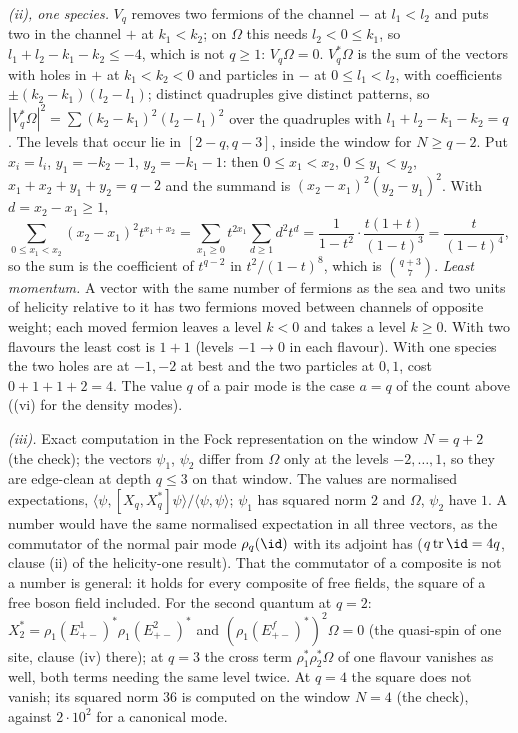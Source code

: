 \emph{(ii), one species.} $V_{q}$ removes two fermions of the channel $-$ at $l_{1} < l_{2}$ and puts two in the channel $+$ at $k_{1} < k_{2}$; on $\Omega$ this needs $l_{2} < 0 \le k_{1}$, so $l_{1} + l_{2} - k_{1} - k_{2} \le -4$, which is not $q \ge 1$: $V_{q}\Omega = 0$. $V_{q}^{*}\Omega$ is the sum of the vectors with holes in $+$ at $k_{1} < k_{2} < 0$ and particles in $-$ at $0 \le l_{1} < l_{2}$, with coefficients $\pm(k_{2} - k_{1})(l_{2} - l_{1})$; distinct quadruples give distinct patterns, so $|V_{q}^{*}\Omega|^{2} = \sum(k_{2} - k_{1})^{2}(l_{2} - l_{1})^{2}$ over the quadruples with $l_{1} + l_{2} - k_{1} - k_{2} = q$. The levels that occur lie in $[2 - q, q - 3]$, inside the window for $N \ge q - 2$. Put $x_{i} = l_{i}$, $y_{1} = -k_{2} - 1$, $y_{2} = -k_{1} - 1$: then $0 \le x_{1} < x_{2}$, $0 \le y_{1} < y_{2}$, $x_{1} + x_{2} + y_{1} + y_{2} = q - 2$ and the summand is $(x_{2} - x_{1})^{2}(y_{2} - y_{1})^{2}$. With $d = x_{2} - x_{1} \ge 1$,
\[
\sum_{0 \le x_{1} < x_{2}}(x_{2} - x_{1})^{2}t^{x_{1} + x_{2}} = \sum_{x_{1} \ge 0}t^{2x_{1}}\sum_{d \ge 1}d^{2}t^{d} = \frac{1}{1 - t^{2}}\cdot\frac{t(1 + t)}{(1 - t)^{3}} = \frac{t}{(1 - t)^{4}} ,
\]
so the sum is the coefficient of $t^{q-2}$ in $t^{2}/(1 - t)^{8}$, which is $\binom{q+3}{7}$. \emph{Least momentum.} A vector with the same number of fermions as the sea and two units of helicity relative to it has two fermions moved between channels of opposite weight; each moved fermion leaves a level $k < 0$ and takes a level $k \ge 0$. With two flavours the least cost is $1 + 1$ (levels $-1 \to 0$ in each flavour). With one species the two holes are at $-1, -2$ at best and the two particles at $0, 1$, cost $0 + 1 + 1 + 2 = 4$. The value $q$ of a pair mode is the case $a = q$ of the count above ((vi) for the density modes).

\emph{(iii).} Exact computation in the Fock representation on the window $N = q + 2$ (the check); the vectors $\psi_{1}$, $\psi_{2}$ differ from $\Omega$ only at the levels $-2, \dots, 1$, so they are edge-clean at depth $q \le 3$ on that window. The values are normalised expectations, $\langle\psi, [X_{q}, X_{q}^{*}]\psi\rangle/\langle\psi, \psi\rangle$; $\psi_{1}$ has squared norm $2$ and $\Omega$, $\psi_{2}$ have $1$. A number would have the same normalised expectation in all three vectors, as the commutator of the normal pair mode $\rho_{q}(\id)$ with its adjoint has ($q\operatorname{tr}\id = 4q$, clause (ii) of the helicity-one result). That the commutator of a composite is not a number is general: it holds for every composite of free fields, the square of a free boson field included. For the second quantum at $q = 2$: $X_{2}^{*} = \rho_{1}(E^{1}_{+-})^{*}\rho_{1}(E^{2}_{+-})^{*}$ and $(\rho_{1}(E^{f}_{+-})^{*})^{2}\Omega = 0$ (the quasi-spin of one site, clause (iv) there); at $q = 3$ the cross term $\rho_{1}^{*}\rho_{2}^{*}\Omega$ of one flavour vanishes as well, both terms needing the same level twice. At $q = 4$ the square does not vanish; its squared norm $36$ is computed on the window $N = 4$ (the check), against $2\cdot 10^{2}$ for a canonical mode.

